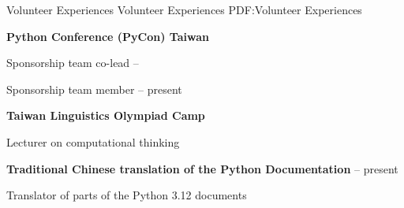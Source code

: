 \documentclass[letterpaper,MMMyyyy,nonstopmode]{simpleresumecv}
\begin{document}
\begin{Body}












\BigGap

\Section
{Volunteer Experiences}
{Volunteer Experiences}
{PDF:Volunteer Experiences}

\Entry
\textbf{Python Conference (PyCon) Taiwan}

\Gap
\BulletItem
Sponsorship team co-lead
\hfill
{} -- 

\Gap
\BulletItem
Sponsorship team member
\hfill
{} -- present


\BigGap

\Entry
\textbf{Taiwan Linguistics Olympiad Camp}
\hfill
{}

\Gap
\BulletItem
Lecturer on computational thinking



\BigGap

\Entry
\textbf{Traditional Chinese translation of the Python Documentation}
\hfill
{} -- present

\Gap
\BulletItem
Translator of parts of the Python 3.12 documents






\end{Body}
\end{document}
